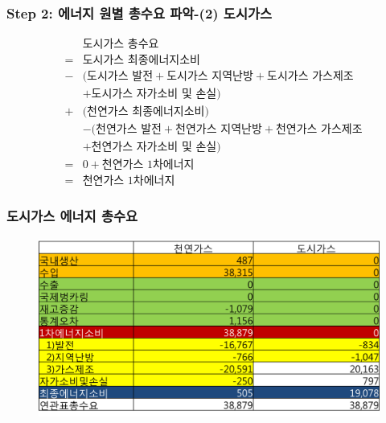 \documentclass[10pt,compress,slidetop,%
			   hyperref={unicode},xcolor={svgnames},%
			   t]{beamer}
\begin{document}
% 
%
\begin{frame}
	\frametitle{Step 2: 에너지 원별 총수요 파악-(2) 도시가스}

\begin{eqnarray*}
& & \mbox{도시가스 총수요}\\
&=& \mbox{도시가스 최종에너지소비}\\
&-&(\mbox{도시가스 발전}+\mbox{도시가스 지역난방}+\mbox{도시가스 가스제조}\\
& &+\mbox{도시가스 자가소비 및 손실})\\
&+&\mbox{(천연가스 최종에너지소비)}\\
& &-(\mbox{천연가스 발전}+\mbox{천연가스 지역난방}+\mbox{천연가스 가스제조}\\
& &+\mbox{천연가스 자가소비 및 손실})\\
&=& 0 +\mbox{천연가스 1차에너지}\\
&=& \mbox{천연가스 1차에너지}
\end{eqnarray*}
	
\end{frame}

\begin{frame}
	\frametitle{도시가스 에너지 총수요}
	  	\begin{figure}
	\centering
	 \includegraphics[width=1.00\textwidth]{GASd.png}
	\end{figure}	
	
\end{frame}
\end{document}
